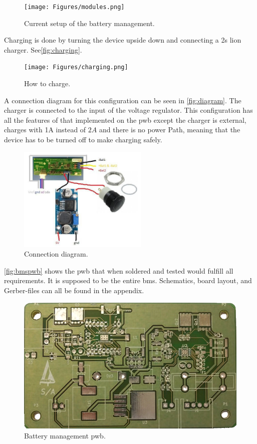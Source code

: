 \begin{figure}[H]
	\centering
	\texttt{[image: Figures/modules.png]}
	\caption{Current setup of the battery management.}
	\label{fig:modules}
\end{figure}


Charging is done by turning the device upside down and connecting a \gls{2s} \gls{lion} charger. See\autoref{fig:charging}.

\begin{figure}[H]
	\centering
	\texttt{[image: Figures/charging.png]}
	\caption{How to charge.}
	\label{fig:charging}
\end{figure}

A connection diagram for this configuration can be seen in \autoref{fig:diagram}. The charger is connected to the input of the voltage regulator. This configuration has all the features of that implemented on the \gls{pwb} except the charger is external, charges with 1A instead of $2A$ and there is no power Path, meaning that the device has to be turned off to make charging safely.

\begin{figure}[H]
	\centering
	\includegraphics[width=0.55\textwidth]{Figures/diagram.jpg}
	\caption{Connection diagram.}
	\label{fig:diagram}
\end{figure} 

\autoref{fig:bmspwb} shows the \gls{pwb} that when soldered and tested would fulfill all requirements. It is supposed to be the entire \gls{bms}. 
Schematics, board layout, and Gerber-files can all be found in the appendix. %

\begin{figure}[H]
	\centering
	\includegraphics[width=.6\textwidth]{Figures/bmspwb.png}
	\caption{Battery management \gls{pwb}.}
	\label{fig:bmspwb}
\end{figure}